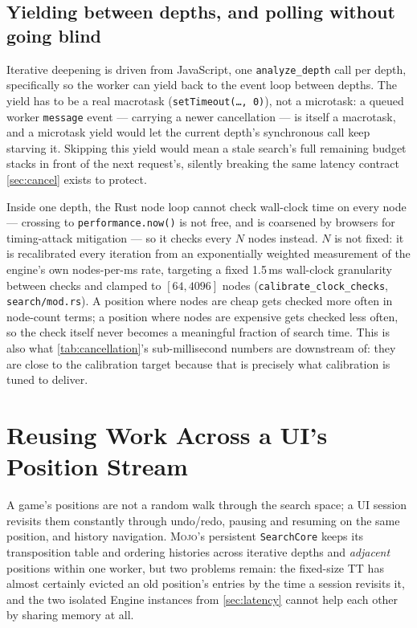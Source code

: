 \documentclass[10pt,twocolumn]{article}
\newcommand{\engine}{\textsc{Mojo}}
\newcommand{\code}[1]{\texttt{#1}}
\begin{document}
\subsection{Yielding between depths, and polling without going blind}

Iterative deepening is driven from JavaScript, one \code{analyze\_depth} call
per depth, specifically so the worker can yield back to the event loop
between depths.  The yield has to be a real macrotask
(\code{setTimeout(…, 0)}), not a microtask: a queued worker \code{message}
event --- carrying a newer cancellation --- is itself a macrotask, and a
microtask yield would let the current depth's synchronous call keep
starving it. Skipping this yield would mean a stale search's full remaining
budget stacks in front of the next request's, silently breaking the same
latency contract \cref{sec:cancel} exists to protect.

Inside one depth, the Rust node loop cannot check wall-clock time on every
node --- crossing to \code{performance.now()} is not free, and is
coarsened by browsers for timing-attack mitigation --- so it checks every
$N$ nodes instead. $N$ is not fixed: it is recalibrated every iteration from
an exponentially weighted measurement of the engine's own nodes-per-ms rate,
targeting a fixed 1.5\,ms wall-clock granularity between checks and clamped
to $[64, 4096]$ nodes (\code{calibrate\_clock\_checks},
\code{search/mod.rs}). A position where nodes are cheap gets checked more
often in node-count terms; a position where nodes are expensive gets checked
less often, so the check itself never becomes a meaningful fraction of
search time. This is also what \cref{tab:cancellation}'s sub-millisecond
numbers are downstream of: they are close to the calibration target because
that is precisely what calibration is tuned to deliver.

\section{Reusing Work Across a UI's Position Stream}
\label{sec:reuse}

A game's positions are not a random walk through the search space; a UI
session revisits them constantly through undo/redo, pausing and resuming on
the same position, and history navigation. \engine's persistent
\code{SearchCore} keeps its transposition table and ordering histories
across iterative depths and \emph{adjacent} positions within one worker, but
two problems remain: the fixed-size TT has almost certainly evicted an old
position's entries by the time a session revisits it, and the two isolated
Engine instances from \cref{sec:latency} cannot help each other by sharing
memory at all.
\end{document}
